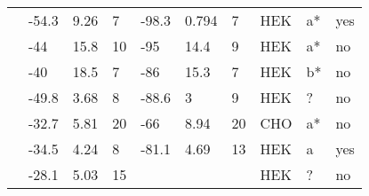 \begin{longtable}{p{5cm}|lll|lll|lll}
\citet{Yang2002MutationDB} & -54.3 & 9.26 & 7 & -98.3 & 0.794 & 7 & HEK & a* & yes \\
\citet{Ye2003MutationDB} & -44 & 15.8 & 10 & -95 & 14.4 & 9 & HEK & a* & no \\
\citet{Ye2003MutationDB} & -40 & 18.5 & 7 & -86 & 15.3 & 7 & HEK & b* & no \\
\citet{Yokoi2005MutationDB} & -49.8 & 3.68 & 8 & -88.6 & 3 & 9 & HEK & ? & no \\
\citet{Young2005MutationDB} & -32.7 & 5.81 & 20 & -66 & 8.94 & 20 & CHO & a* & no \\
\citet{Zeng2013MutationDB} & -34.5 & 4.24 & 8 & -81.1 & 4.69 & 13 & HEK & a & yes \\
\citet{Zhang2015MutationDB} & -28.1 & 5.03 & 15 & && & HEK & ? & no \\
\end{longtable}
